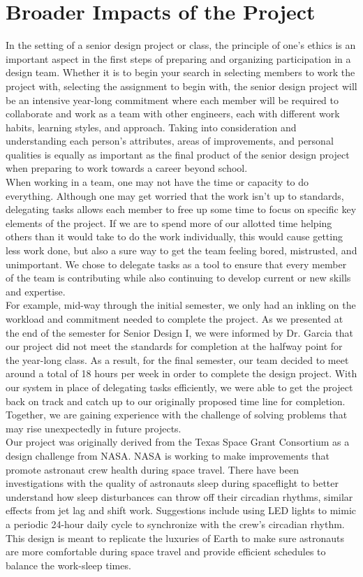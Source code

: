 \documentclass[12pt,a4paper]{report}
\begin{document}
\section{Broader Impacts of the Project}
In the setting of a senior design project or class, the principle of one's ethics is an important aspect in the first steps of preparing and organizing participation in a design team. Whether it is to begin your search in selecting members to work the project with, selecting the assignment to begin with, the senior design project will be an intensive year-long commitment where each member will be required to collaborate and work as a team with other engineers, each with different work habits, learning styles, and approach. Taking into consideration and understanding each person's attributes, areas of improvements, and personal qualities is equally as important as the final product of the senior design project when preparing to work towards a career beyond school. \\
When working in a team, one may not have the time or capacity to do everything. Although one may get worried that the work isn't up to standards, delegating tasks allows each member to free up some time to focus on specific key elements of the project. If we are to spend more of our allotted time helping others than it would take to do the work individually, this would cause getting less work done, but also a sure way to get the team feeling bored, mistrusted, and unimportant.  We chose to delegate tasks as a tool to ensure that every member of the team is contributing while also continuing to develop current or new skills and expertise.\\ 
For example, mid-way through the initial semester, we only had an inkling on the workload and commitment needed to complete the project. As we presented at the end of the semester for Senior Design I, we were informed by Dr. Garcia that our project did not meet the standards for completion at the halfway point for the year-long class. As a result, for the final semester, our team decided to meet around a total of 18 hours per week in order to complete the design project. With our system in place of delegating tasks efficiently, we were able to get the project back on track and catch up to our originally proposed time line for completion. Together, we are gaining experience with the challenge of solving problems that may rise unexpectedly in future projects. \\
Our project was originally derived from the Texas Space Grant Consortium as a design challenge from NASA. NASA is working to make improvements that promote astronaut crew health during space travel. There have been investigations with the quality of astronauts sleep during spaceflight to better understand how sleep disturbances can throw off their circadian rhythms, similar effects from jet lag and shift work. Suggestions include using LED lights to mimic a periodic 24-hour daily cycle to synchronize with the crew's circadian rhythm. This design is meant to replicate the luxuries of Earth to make sure astronauts are more comfortable during space travel and provide efficient schedules to balance the work-sleep times. \\
\end{document}
